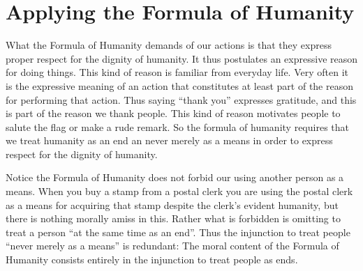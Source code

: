 
\section{Applying the Formula of Humanity}\label{sec:applying_the_formula_of_humanity} %

What the Formula of Humanity demands of our actions is that they express proper respect for the dignity of humanity. It thus postulates an expressive reason for doing things. This kind of reason is familiar from everyday life. Very often it is the expressive meaning of an action that constitutes at least part of the reason for performing that action. Thus saying ``thank you'' expresses gratitude, and this is part of the reason we thank people. This kind of reason motivates people to salute the flag or make a rude remark. So the formula of humanity requires that we treat humanity as an end an never merely as a means in order to express respect for the dignity of humanity.

Notice the Formula of Humanity does not forbid our using another person as a means. When you buy a stamp from a postal clerk you are using the postal clerk as a means for acquiring that stamp despite the clerk’s evident humanity, but there is nothing morally amiss in this. Rather what is forbidden is omitting to treat a person ``at the same time as an end''. Thus the injunction to treat people ``never merely as a means'' is redundant: The moral content of the Formula of Humanity consists entirely in the injunction to treat people as ends.

